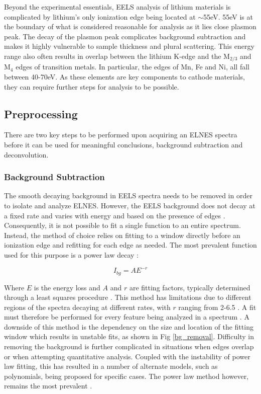 Beyond the experimental essentials, EELS analysis of lithium materials is complicated by lithium's only ionization edge being located at $\mathrm{\sim}$55eV.  55eV is at the boundary of what is considered reasonable for analysis as it lies close plasmon peak. The decay of the plasmon peak complicates background subtraction and makes it highly vulnerable to sample thickness and plural scattering.  This energy range also often results in overlap between the lithium K-edge and the $\mathrm{M_{2 / 3}}$ and $\mathrm{M_4}$ edges of transition metals. In particular, the edges of Mn, Fe and Ni, all fall between 40-70eV.  As these elements are key components to cathode materials, they can require further steps for analysis to be possible.



\subsection{Preprocessing}

There are two key steps to be performed upon acquiring an ELNES spectra before it can be used for meaningful conclusions, background subtraction and deconvolution. 





\subsubsection{Background Subtraction} \label{bg_section}
The smooth decaying background in EELS spectra needs to be removed in order to isolate and analyze ELNES.  However, the EELS background does not decay at a fixed rate and varies with energy and based on the presence of edges \cite{new_bg}. Consequently, it is not possible to fit a single function to an entire spectrum.  Instead, the method of choice relies on fitting to a window directly before an ionization edge and refitting for each edge as needed.  The most prevalent function used for this purpose is a power law decay \cite{Egerton}: 

\begin{equation}
	I_{bg} = AE^{-r}
\end{equation}


Where $E$ is the energy loss and $A$ and $r$ are fitting factors, typically determined through a least squares procedure \cite{reimer_transmission_2008}.  This method has limitations due to different regions of the spectra decaying at different rates, with $r$ ranging from 2-6.5 \cite{reimer_transmission_2008}. A fit must therefore be performed for every feature being analyzed in a spectrum \cite{verbeeck_model_2004, egerton_inelastic_1975}.  A downside of this method is the dependency on the size and location of the fitting window which results in unstable fits, as shown in Fig \ref{bg_removal}.  Difficulty in removing the background is further complicated in situations when edges overlap or when attempting quantitative analysis.  Coupled with the instability of power law fitting, this has resulted in a number of alternate models, such as polynomials, being proposed for specific cases. The power law method however, remains the most prevalent \cite{verbeeck_model_2004, riedl_extraction_2006}.  

